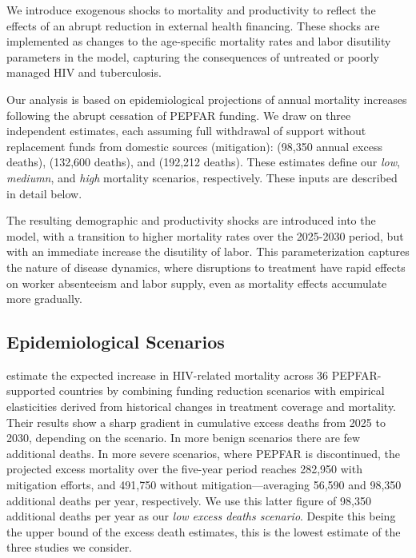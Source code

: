\documentclass[letterpaper,12pt]{article}
\theoremstyle{definition}
\begin{document}
\begin{spacing}{1.5}
We introduce exogenous shocks to mortality and productivity to reflect the effects of an abrupt reduction in external health financing. These shocks are implemented as changes to the age-specific mortality rates and labor disutility parameters in the model, capturing the consequences of untreated or poorly managed HIV and tuberculosis.

Our analysis is based on epidemiological projections of annual mortality increases following the abrupt cessation of PEPFAR funding. We draw on three independent estimates, each assuming full withdrawal of support without replacement funds from domestic sources (mitigation): \citet{Brink2025} (98,350 annual excess deaths), \citet{Gandhi2025} (132,600 deaths), and \citet{KS2025} (192,212 deaths). These estimates define our \textit{low}, \textit{mediumn}, and \textit{high} mortality scenarios, respectively. These inputs are described in detail below.

The resulting demographic and productivity shocks are introduced into the model, with a transition to higher mortality rates over the 2025-2030 period, but with an immediate increase the disutility of labor. This parameterization captures the nature of disease dynamics, where disruptions to treatment have rapid effects on worker absenteeism and labor supply, even as mortality effects accumulate more gradually.


\subsection{Epidemiological Scenarios}

\citet{Brink2025} estimate the expected increase in HIV-related mortality across 36 PEPFAR-supported countries by combining funding reduction scenarios with empirical elasticities derived from historical changes in treatment coverage and mortality. Their results show a sharp gradient in cumulative excess deaths from 2025 to 2030, depending on the scenario. In more benign scenarios there are few additional deaths. In more severe scenarios, where PEPFAR is discontinued, the projected excess mortality over the five-year period reaches 282,950 with mitigation efforts, and 491,750 without mitigation—averaging 56,590 and 98,350 additional deaths per year, respectively. We use this latter figure of 98,350 additional deaths per year as our \textit{low excess deaths scenario}. Despite this being the upper bound of the \citet{Brink2025} excess death estimates, this is the lowest estimate of the three studies we consider.


\end{spacing}
\end{document}
